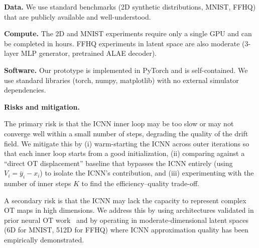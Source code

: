 \documentclass[10pt,conference,compsocconf]{IEEEtran}
\begin{document}
\textbf{Data.}
We use standard benchmarks (2D synthetic distributions, MNIST, FFHQ) that are publicly available and well-understood.

\textbf{Compute.}
The 2D and MNIST experiments require only a single GPU and can be completed in hours.
FFHQ experiments in latent space are also moderate (3-layer MLP generator, pretrained ALAE decoder).

\textbf{Software.}
Our prototype is implemented in PyTorch and is self-contained.
We use standard libraries (torch, numpy, matplotlib) with no external simulator dependencies.

\textbf{Risks and mitigation.}

The primary risk is that the ICNN inner loop may be too slow or may not converge well within a small number of steps, degrading the quality of the drift field.
We mitigate this by (i) warm-starting the ICNN across outer iterations so that each inner loop starts from a good initialization, (ii) comparing against a ``direct OT displacement'' baseline that bypasses the ICNN entirely (using $V_i = \bar{y}_i - x_i$) to isolate the ICNN's contribution, and (iii) experimenting with the number of inner steps $K$ to find the efficiency--quality trade-off.

A secondary risk is that the ICNN may lack the capacity to represent complex OT maps in high dimensions.
We address this by using architectures validated in prior neural OT work~\cite{makkuva2020optimal,korotin2022neural} and by operating in moderate-dimensional latent spaces (6D for MNIST, 512D for FFHQ) where ICNN approximation quality has been empirically demonstrated.




\end{document}
